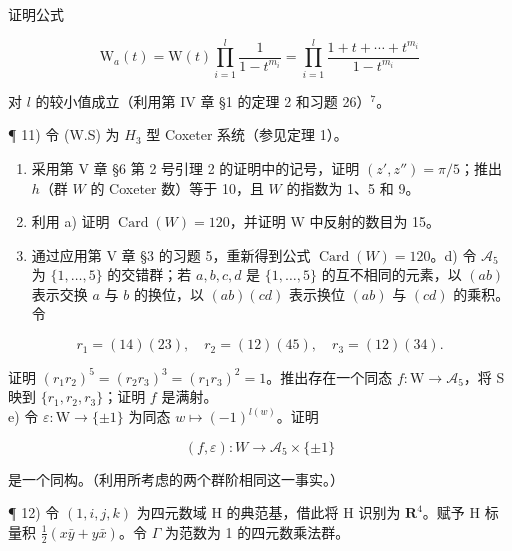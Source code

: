 证明公式

\[
\mathrm{W} _ {a} (t) = \mathrm{W} (t) \prod_ {i = 1} ^ {l} \frac {1}{1 - t ^ {m _ {i}}} = \prod_ {i = 1} ^ {l} \frac {1 + t + \cdots + t ^ {m _ {i}}}{1 - t ^ {m _ {i}}}
\]

对 \(l\) 的较小值成立（利用第 IV 章 §1 的定理 2 和习题 26）\(^{7}\)。

¶ 11) 令 (W.S) 为 \(H_{3}\) 型 Coxeter 系统（参见定理 1）。

\begin{enumerate}
\def\labelenumi{\alph{enumi})}
\item
  采用第 V 章 §6 第 2 号引理 2 的证明中的记号，证明 \((z', z'') = \pi/5\)；推出 \(h\)（群 \(W\) 的 Coxeter 数）等于 10，且 \(W\) 的指数为 1、5 和 9。
\item
  利用 a) 证明 \(\operatorname{Card}(W) = 120\)，并证明 W 中反射的数目为 15。
\item
  通过应用第 V 章 §3 的习题 5，重新得到公式 \(\operatorname{Card}(W) = 120\)。d) 令 \(\mathcal{A}_5\) 为 \(\{1, \ldots, 5\}\) 的交错群；若 \(a, b, c, d\) 是 \(\{1, \ldots, 5\}\) 的互不相同的元素，以 \((ab)\) 表示交换 \(a\) 与 \(b\) 的换位，以 \((ab)(cd)\) 表示换位 \((ab)\) 与 \((cd)\) 的乘积。令
\end{enumerate}

\[
r _ {1} = (14) (23), \quad r _ {2} = (12) (45), \quad r _ {3} = (12) (34).
\]

证明 \((r_1r_2)^5 = (r_2r_3)^3 = (r_1r_3)^2 = 1\)。推出存在一个同态 \(f: \mathrm{W} \to \mathcal{A}_5\)，将 S 映到 \(\{r_1, r_2, r_3\}\)；证明 \(f\) 是满射。\\
e) 令 \(\varepsilon: \mathrm{W} \to \{\pm 1\}\) 为同态 \(w \mapsto (-1)^{l(w)}\)。证明

\[
(f, \varepsilon): W \rightarrow \mathcal {A} _ {5} \times \{\pm 1 \}
\]

是一个同构。（利用所考虑的两个群阶相同这一事实。）

¶ 12) 令 \((1, i, j, k)\) 为四元数域 H 的典范基，借此将 H 识别为 \(\mathbf{R}^4\)。赋予 H 标量积 \(\frac{1}{2}(x\bar{y} + y\bar{x})\)。令 \(\Gamma\) 为范数为 1 的四元数乘法群。

